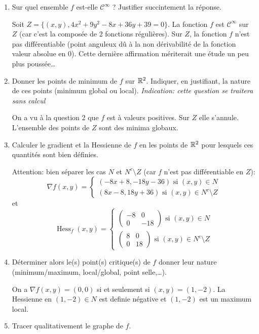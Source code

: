 \documentclass{tp_um}
\begin{document}
\begin{enumerate}
\bigskip

	\item Sur quel ensemble $f$ est-elle $\mathcal C^\infty$ ? Justifier succintement la réponse.
	
		\bigskip
		Soit  $Z =\{ (x,y) , 4x^2 + 9y^2 - 8x + 36y + 39= 0 \}$. La fonction $f$ est $\mathcal C^\infty$ sur $Z$ (car c'est la composée de 2 fonctions régulières). Sur $Z$, la fonction $f$ n'est pas différentiable (point anguleux dû à la non dérivabilité de la fonction valeur absolue en $0$). Cette dernière affirmation mériterait une étude un peu plus poussée\ldots
		\bigskip

	\item Donner les points de minimum de $f$ sur $\mathbb{R}^2$. Indiquer, en justifiant, la nature de ces points (minimum global ou local).
		\textit{Indication: cette question se traitera sans calcul}
	
		\bigskip
	On a vu à la question 2 que $f$ est à valeurs positives. Sur $Z$ elle s'annule. L'ensemble des points de $Z$ sont des minima globaux.
		\bigskip
	\item Calculer le gradient et la Hessienne de $f$ en les points de $\mathbb{R}^2$ pour lesquels ces quantités sont bien définies.
		\bigskip

	Attention: bien séparer les cas $N$ et $N^c\setminus Z$ (car $f$ n'est pas différentiable en $Z$):
	\[
		\nabla f(x,y) = \begin{cases}
		(-8x+8,-18y-36)  \text{ si $(x,y) \in N$}\\
		(8x-8,18y +36)	 \text{ si $(x,y) \in N^c\setminus Z$}
		\end{cases}
	\]
	et
	\[
		\operatorname{Hess}_f (x,y) = \begin{cases}
			\begin{pmatrix}
				 -8 & 0 \\ 0 & -18
			 \end{pmatrix} \text{ si $(x,y) \in N$}\\
			 \begin{pmatrix}
				 8 & 0 \\ 0 & 18
			 \end{pmatrix}\text{ si $(x,y) \in N^c\setminus Z$}
		\end{cases}
	\]

		\bigskip

	\item Déterminer alors le(s) point(s) critique(s) de $f$ donner leur nature (minimum/maximum, local/global, point selle,\ldots).

		\bigskip
On a $\nabla f (x,y) = (0,0)$ si et seulement si $(x,y) =(1,-2)$. La Hessienne en $(1,-2)\in N$ est definie négative et $(1,-2) $ est un maximum local.
		\bigskip
	\item Tracer qualitativement le graphe de $f$.


\end{enumerate}
\end{document}
